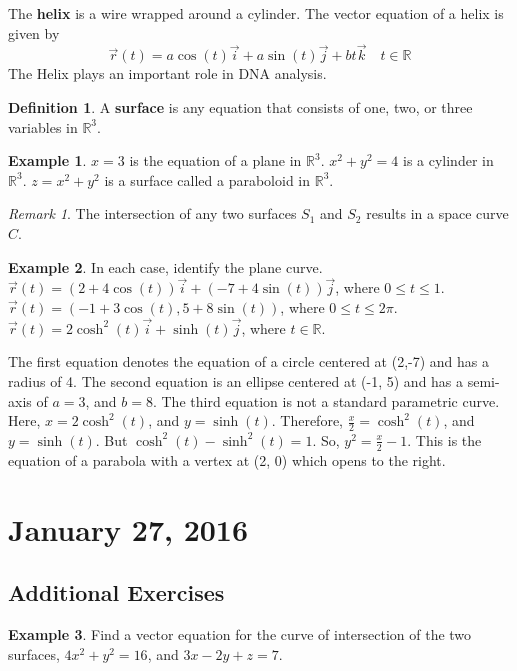 \documentclass[11pt]{article}
\theoremstyle{plain} %
\theoremstyle{definition}
\newtheorem*{definition}{Definition} %
\theoremstyle{example}
\newtheorem*{example}{Example}
\theoremstyle{remark}
\newtheorem*{remark}{Remark}
\begin{document}
\bigskip

The \textbf{helix} is a wire wrapped around a cylinder. The vector equation of a helix is given by
$$\vec{r}(t) = a \cos(t) \vec{i} + a \sin(t)\vec{j} + bt\vec{k}\quad t \in \mathbb R$$
The Helix plays an important role in DNA analysis.

\begin{definition}
A \textbf{surface} is any equation that consists of one, two, or three variables in $\mathbb R^3$.
\end{definition}

\begin{example}
$x = 3$ is the equation of a plane in $\mathbb R^3$.
$x^2 + y^2 = 4$ is a cylinder in $\mathbb R^3$.
$z = x^2 + y^2$ is a surface called a paraboloid in $\mathbb R^3$.
\end{example}

\begin{remark}
The intersection of any two surfaces $S_1$ and $S_2$ results in a space curve $C$.

\end{remark}

\begin{example}
In each case, identify the plane curve. $\vec{r}(t) = (2 + 4 \cos(t))\vec{i} + (-7 + 4 \sin(t))\vec{j}$, where $0 \leq t \leq 1$.
$\vec{r}(t) = (-1 +  3\cos(t), 5 + 8 \sin(t))$, where $0 \leq t \leq 2\pi$.
$\vec{r}(t) = 2 \cosh^2(t)\vec{i} + \sinh(t)\vec{j}$, where $t \in \mathbb R$.
\end{example}

The first equation denotes the equation of a circle centered at (2,-7) and has a radius of 4. The second equation is an ellipse centered at (-1, 5) and has a semi-axis of $a = 3$, and $b = 8$. The third equation is not a standard parametric curve. Here, $x = 2 \cosh^2(t)$, and $y = \sinh(t)$. Therefore, $\frac{x}{2} = \cosh^2(t)$, and $y = \sinh(t)$. But $\cosh^2(t) - \sinh^2(t) = 1$.  So, $y^2 = \frac{x}{2} -1$. This is the equation of a parabola with a vertex at (2, 0) which opens to the right.


\section{January 27, 2016}
\subsection{Additional Exercises}

\begin{example}
Find a vector equation for the curve of intersection of the two surfaces, $4x^2 + y^2 = 16$, and $3x-2y+z = 7$.
\end{example}
\end{document}
